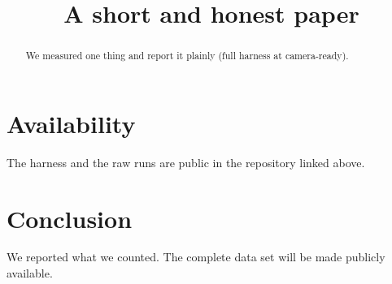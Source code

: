 \documentclass[sigconf,screen]{acmart}
\begin{document}
\title{A short and honest paper}

\begin{abstract}
We measured one thing and report it plainly (full harness at camera-ready).
\end{abstract}

\section{Availability}
The harness and the raw runs are public in the repository linked above.

\section{Conclusion}
We reported what we counted. The complete data set will be made publicly available.
\end{document}
